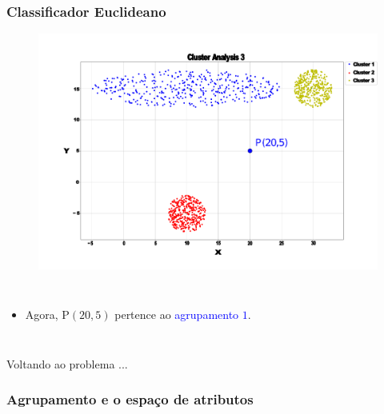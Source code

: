 \documentclass[aspectratio=10]{beamer} %
\begin{document}
\begin{frame}
	\frametitle{Classificador Euclideano}
	\begin{figure}[H]
		\includegraphics[scale=0.14]{Imagens/clusteranalise3blue.pdf}
	\end{figure}
	
	\begin{columns}
		\footnotesize
		\justifying
		\begin{itemize}
			\item Agora, P$(20,5)$ pertence ao  \textcolor{blue}{agrupamento $1$}.
		\end{itemize}
	\end{columns}
\end{frame}

\begin{frame}
	\begin{huge}
		\centering
		Voltando ao problema ...
	\end{huge}
\end{frame}

\subsubsection{Agrupamento e o espaço de atributos}
\end{document}
